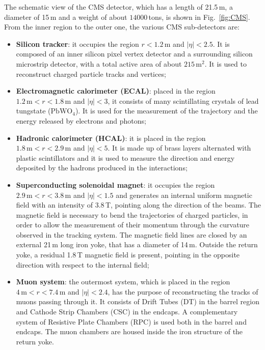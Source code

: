 The schematic view of the CMS detector, which has a length of 21.5\,m, a diameter of 15\,m and a weight of about $14000$\,tons, is shown in Fig.~\ref{fig:CMS}. From the inner region to the outer one, the various CMS sub-detectors are:
\begin{itemize}
\item {\bf Silicon tracker}: it occupies the region $r < 1.2$\,m and $|\eta|<2.5$. It is composed of an inner silicon pixel vertex detector and a surrounding silicon microstrip detector, with a total active area of about $215\,\mathrm{m^2}$. It is used to reconstruct charged particle tracks and vertices;
\item {\bf Electromagnetic calorimeter (ECAL)}: placed in the region $1.2\,\mathrm{m} < r < 1.8\,\mathrm{m}$ and $|\eta|<3$, it consists of many scintillating crystals of lead tungstate ($\mathrm{PbWO_4}$). It is used for the measurement of the trajectory and the energy released by electrons and photons;
\item {\bf Hadronic calorimeter (HCAL)}: it is placed in the region $1.8\,\mathrm{m} < r < 2.9\,\mathrm{m}$ and $|\eta|<5$. It is made up of brass layers alternated with plastic scintillators and it is used to measure the direction and energy deposited by the hadrons produced in the interactions;
\item {\bf Superconducting solenoidal magnet}: it occupies the region $2.9\,\mathrm{m} < r < 3.8\,\mathrm{m}$ and $|\eta|<1.5$ and generates an internal uniform magnetic field with an intensity of 3.8\,T, pointing along the direction of the beams. The magnetic field is necessary to bend the trajectories of charged particles, in order to allow the measurement of their momentum through the curvature observed in the tracking system. The magnetic field lines are closed by an external 21\,m long iron yoke, that has a diameter of 14\,m. Outside the return yoke, a residual 1.8\,T magnetic field is present, pointing in the opposite direction with respect to the internal field;
\item {\bf Muon system}: the outermost system, which is placed in the region $4\,\mathrm{m} < r < 7.4\,\mathrm{m}$ and $|\eta|<2.4$, has the purpose of reconstructing the tracks of muons passing through it. It consists of Drift Tubes (DT) in the barrel region and Cathode Strip Chambers (CSC) in the endcaps. A complementary system of Resistive Plate Chambers (RPC) is used both in the barrel and endcaps. The muon chambers are housed inside the iron structure of the return yoke.
\end{itemize}

